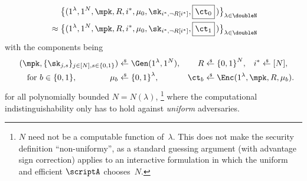 \begin{definition}
\begin{align*}
&
\bigl\{(
1^\lambda,1^N,\mpk,R,i^\ast,\mu_0,\sk_{i^\ast,\neg R[i^\ast]},\boxed{\ct_0\vphantom|}\,
)\bigr\}_{\lambda\in\doubleN}
\\
{}\approx{}&
\bigl\{(
1^\lambda,1^N,\mpk,R,i^\ast,\mu_0,\sk_{i^\ast,\neg R[i^\ast]},\boxed{\ct_1\vphantom|}\,
)\bigr\}_{\lambda\in\doubleN}
\end{align*}
with the components being
\begin{align*}
(\mpk,\{\sk_{j,s}\}_{j\in[N],s\in\bit})
&{}\draws\Gen(1^\lambda,1^N),&
R&{}\draws\bit^N,&
i^\ast&{}\draws[N],\\
\textup{for }b\in\bit,\WideNarrow{\qquad}{}\qquad
\mu_b&{}\draws\bit^\lambda,&
\ct_b&\mathrlap{{}\draws\Enc(1^\lambda,\mpk,R,\mu_b).}
\end{align*}
for all polynomially bounded ${N=N(\lambda)}$,%
\footnote{$N$ need not be a computable function of~$\lambda$.
This does not make the security definition ``non-uniformy'',
as a standard guessing argument (with advantage sign correction) applies to an interactive formulation
in which the uniform and efficient $\scriptA$ chooses~$N$.}
where the computational indistinguishability only has to hold against \emph{uniform} adversaries.
\end{definition}
